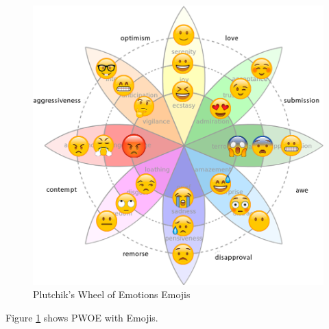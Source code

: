 \begin{figure}[H]
	\includegraphics[width=\columnwidth, keepaspectratio]{PWOEEmoji}
	\caption{Plutchik's Wheel of Emotions Emojis}
	\label{Fig:fig4}
\end{figure}
Figure \ref{Fig:fig4} shows PWOE with Emojis.
